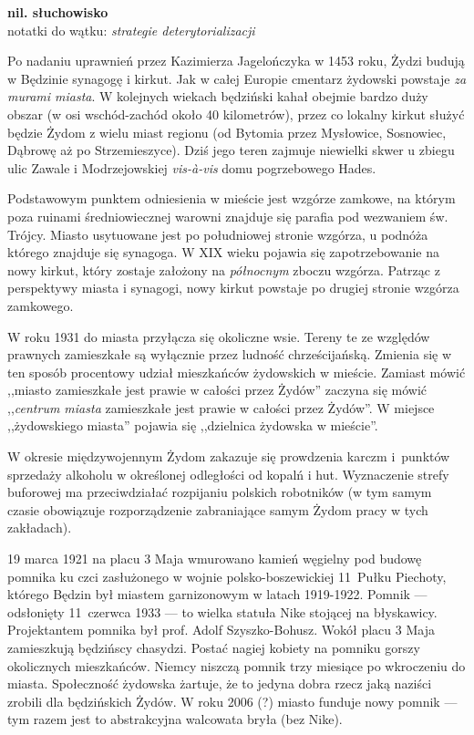 \documentclass[11pt,a4paper,oneside]{article}
\begin{document}
\textbf{nil. słuchowisko}\\
notatki do wątku: \emph{strategie deterytorializacji}

Po nadaniu uprawnień przez Kazimierza Jagelończyka w 1453 roku, Żydzi budują
w Będzinie synagogę i kirkut. Jak w całej Europie cmentarz żydowski powstaje
\emph{za murami miasta}. W kolejnych wiekach będziński kahał obejmie bardzo
duży obszar (w osi wschód-zachód około 40 kilometrów), przez co lokalny kirkut
służyć będzie Żydom z wielu miast regionu (od Bytomia przez Mysłowice,
Sosnowiec, Dąbrowę aż po Strzemieszyce). Dziś jego teren zajmuje niewielki
skwer u zbiegu ulic Zawale i Modrzejowskiej \emph{vis-\`{a}-vis} domu
pogrzebowego Hades.

Podstawowym punktem odniesienia w mieście jest wzgórze zamkowe, na którym poza
ruinami średniowiecznej warowni znajduje się parafia pod wezwaniem św. Trójcy.
Miasto usytuowane jest po południowej stronie wzgórza, u podnóża którego
znajduje się synagoga. W XIX wieku pojawia się zapotrzebowanie na nowy kirkut,
który zostaje założony na \emph{północnym} zboczu wzgórza. Patrząc z perspektywy
miasta i synagogi, nowy kirkut powstaje po drugiej stronie wzgórza zamkowego.

W roku 1931 do miasta przyłącza się okoliczne wsie. Tereny te ze względów
prawnych zamieszkałe są wyłącznie przez ludność chrześcijańską. Zmienia się
w ten sposób procentowy udział mieszkańców żydowskich w mieście. Zamiast mówić
,,miasto zamieszkałe jest prawie w całości przez Żydów'' zaczyna się mówić
,,\emph{centrum miasta} zamieszkałe jest prawie w całości przez Żydów''.
W miejsce ,,żydowskiego miasta'' pojawia się ,,dzielnica żydowska w mieście''.

W okresie międzywojennym Żydom zakazuje się prowdzenia karczm i~punktów
sprzedaży alkoholu w określonej odległości od kopalń i hut. Wyznaczenie strefy
buforowej ma przeciwdziałać rozpijaniu polskich robotników (w tym samym czasie
obowiązuje rozporządzenie zabraniające samym Żydom pracy w tych zakładach).

19 marca 1921 na placu 3 Maja wmurowano kamień węgielny pod budowę pomnika ku
czci zasłużonego w wojnie polsko-boszewickiej 11~Pułku Piechoty, którego Będzin
był miastem garnizonowym w latach 1919-1922. Pomnik --- odsłonięty 11~czerwca
1933 --- to wielka statuła Nike stojącej na błyskawicy. Projektantem pomnika
był prof.  Adolf Szyszko-Bohusz. Wokół placu 3 Maja zamieszkują będzińscy
chasydzi.  Postać nagiej kobiety na pomniku gorszy okolicznych mieszkańców.
Niemcy niszczą pomnik trzy miesiące po wkroczeniu do miasta. Społeczność
żydowska żartuje, że to jedyna dobra rzecz jaką naziści zrobili dla będzińskich
Żydów. W roku 2006 (?) miasto funduje nowy pomnik --- tym razem jest to
abstrakcyjna walcowata bryła (bez Nike).  
\end{document}
